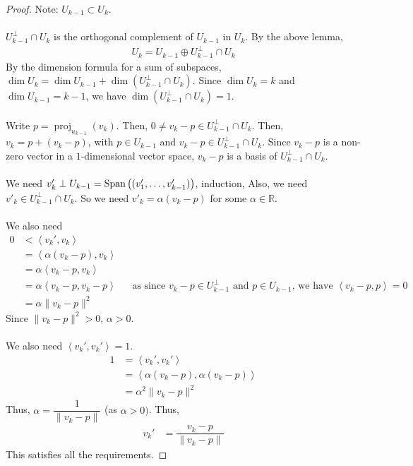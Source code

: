 \documentclass[letterpaper,12pt]{article}
\DeclareMathOperator{\proj}{proj}
\begin{document}
\begin{proof}
Note: $U_{k-1} \subset U_k$.
\\ \\ $U_{k-1}^{\perp} \cap U_k$ is the orthogonal complement of $U_{k-1}$ in $U_k$. By the above lemma,
\begin{align*}
    U_k = U_{k-1} \oplus U_{k-1}^{\perp} \cap U_k
\end{align*}
By the dimension formula for a sum of subspaces, $\dim{U_k} = \dim{U_{k-1}} + \dim{(U^{\perp}_{k-1} \cap U_k)}$. Since $\dim{U_k} = k$ and $\dim{U_{k-1}} = k-1$, we have $\dim{(U^{\perp}_{k-1} \cap U_k)} = 1$.
\\ \\ Write $p = \proj_{u_{k-1}}(v_k)$. Then, $0 \neq v_k - p \in U_{k-1}^{\perp} \cap U_k$. Then, $v_k = p + (v_k - p)$, with $p \in U_{k-1}$ and $v_k - p \in U_{k-1}^{\perp} \cap U_k$. Since $v_k - p$ is a non-zero vector in a $1$-dimensional vector space, $v_k - p$ is a basis of $U_{k-1}^{\perp} \cap U_k$.
\\ \\ We need $v_k' \perp U_{k-1} = \text{Span}\left((v'_1, \dots, v'_{k-1}) \right)$, induction, Also, we need $v'_k \in U_{k-1}^{\perp} \cap U_k$. So we need $v'_k = \alpha (v_k - p)$ for some $\alpha \in \mathbb{R}$.
\\ \\ We also need
\begin{align*}
    0 & < \left< v_k', v_k \right> \\
    & = \left< \alpha(v_k - p), v_k \right> \\
    & = \alpha \left< v_k - p, v_k \right> \\
    & = \alpha \left< v_k - p, v_k - p \right> && \text{as since $v_k-p \in U_{k-1}^{\perp}$ and $p \in U_{k-1}$, we have $\left<v_k - p, p \right> = 0$} \\
    & = \alpha \| v_k - p \|^2
\end{align*}
Since $\| v_k - p \|^2 > 0$, $\alpha > 0$.
\\ \\ We also need $\left<v_k', v_k' \right> = 1$.
\begin{align*}
    1 & = \left< v_k', v_k' \right> \\
    & = \left< \alpha(v_k - p), \alpha(v_k - p) \right> \\
    & = \alpha^2 \| v_k - p \|^2
\end{align*}
Thus, $\alpha = \dfrac{1}{\| v_k - p \|}$ (as $\alpha > 0)$. Thus,
\begin{align*}
    v_k' & = \dfrac{v_k-p}{\| v_k - p \|}
\end{align*}
This satisfies all the requirements.
\end{proof}
\end{document}
